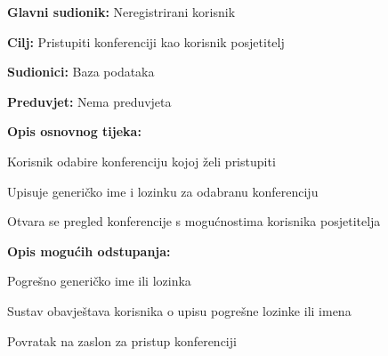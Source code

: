 					\noindent {}
					\begin{packed_item}
						
						\item \textbf{Glavni sudionik: } Neregistrirani korisnik
						\item  \textbf{Cilj:} Pristupiti konferenciji kao korisnik posjetitelj
						\item  \textbf{Sudionici:} Baza podataka
						\item  \textbf{Preduvjet:} Nema preduvjeta
						\item  \textbf{Opis osnovnog tijeka:}
						
						\item[] \begin{packed_enum}
							
							\item Korisnik odabire konferenciju kojoj želi pristupiti
							\item Upisuje generičko ime i lozinku za odabranu konferenciju
							\item Otvara se pregled konferencije s mogućnostima korisnika posjetitelja
						\end{packed_enum}
						
						\item  \textbf{Opis mogućih odstupanja:}
						
						\item[] \begin{packed_item}
							
							\item[2.a] Pogrešno generičko ime ili lozinka
							\item[] \begin{packed_enum}
								
								\item Sustav obavještava korisnika o upisu pogrešne lozinke ili imena
								\item Povratak na zaslon za pristup konferenciji
								
							\end{packed_enum}
							
						\end{packed_item}
					\end{packed_item}
					
